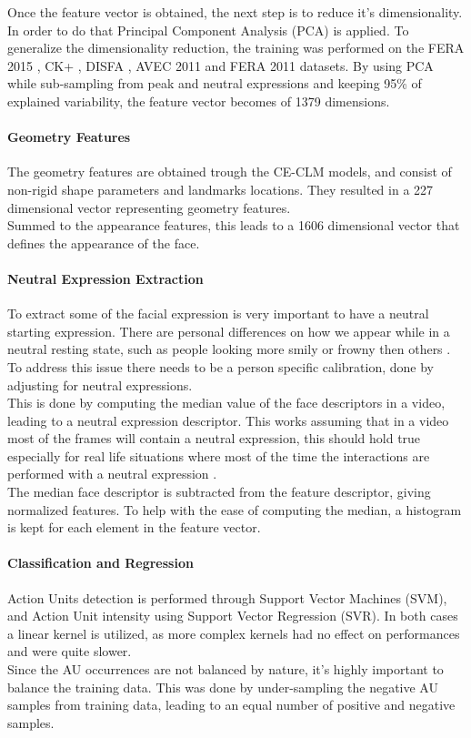 Once the feature vector is obtained, the next step is to reduce it's dimensionality. In order to do that Principal Component Analysis (PCA) is applied. To generalize the dimensionality reduction, the training was performed on the FERA 2015 \cite{FERA15}, CK+ \cite{CK+}, DISFA \cite{DISFA}, AVEC 2011 \cite{AVEC11} and FERA 2011 \cite{FERA11} datasets. By using PCA while sub-sampling from peak and neutral expressions and keeping 95\% of explained variability, the feature vector becomes of 1379 dimensions.

\paragraph{Geometry Features}
The geometry features are obtained trough the CE-CLM models, and consist of non-rigid shape parameters and landmarks locations. They resulted in a 227 dimensional vector representing geometry features.\\
Summed to the appearance features, this leads to a 1606 dimensional vector that defines the appearance of the face.

\paragraph{Neutral Expression Extraction}
To extract some of the facial expression is very important to have a neutral starting expression. There are personal differences on how we appear while in a neutral resting state, such as people looking more smily or frowny then others \cite{normexpr}. To address this issue there needs to be a person specific calibration, done by adjusting for neutral expressions.\\
This is done by computing the median value of the face descriptors in a video, leading to a neutral expression descriptor. This works assuming that in a video most of the frames will contain a neutral expression, this should hold true especially for real life situations where most of the time the interactions are performed with a neutral expression \cite{NatAffData}.\\
The median face descriptor is subtracted from the feature descriptor, giving normalized features. To help with the ease of computing the median, a histogram is kept for each element in the feature vector.

\paragraph{Classification and Regression}
Action Units detection is performed through Support Vector Machines (SVM), and Action Unit intensity using Support Vector Regression (SVR). In both cases a linear kernel is utilized, as more complex kernels had no effect on performances and were quite slower. \\
Since the AU occurrences are not balanced by nature, it's highly important to balance the training data. This was done by under-sampling the negative AU samples from training data, leading to an equal number of positive and negative samples.

